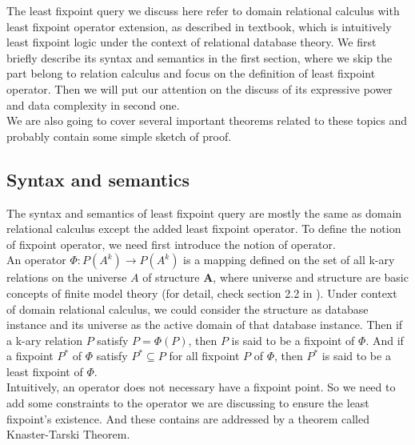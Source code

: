 The least fixpoint query we discuss here refer to domain relational calculus with least fixpoint operator extension, as described in textbook\cite{Abiteboul1}, which is intuitively least fixpoint logic under the context of relational database theory. We first briefly describe its syntax and semantics in the first section, where we skip the part belong to relation calculus and focus on the definition of least fixpoint operator. Then we will put our attention on the discuss of its expressive power and data complexity in second one. \\
We are also going to cover several important theorems related to these topics and probably contain some simple sketch of proof.

\subsection{Syntax and semantics}
The syntax and semantics of least fixpoint query are mostly the same as domain relational calculus except the added least fixpoint operator. To define the notion of fixpoint operator, we need first introduce the notion of operator. \\
An operator $\Phi: \textit{P}(A^k)\rightarrow \textit{P}(A^k)$ is a mapping defined on the set of all k-ary relations on the universe $A$ of structure $\textbf{A}$, where universe and structure are basic concepts of finite model theory (for detail, check section 2.2 in \cite{kolaitis1}). Under context of domain relational calculus, we could consider the structure as database instance and its universe as the active domain of that database instance. Then if a k-ary relation $P$ satisfy $P=\Phi(P)$, then $P$ is said to be a fixpoint of $\Phi$. And if a fixpoint $P^*$ of $\Phi$ satisfy $P^*\subseteq P$ for all fixpoint $P$ of $\Phi$, then $P^*$ is said to be a least fixpoint of $\Phi$.\\
Intuitively, an operator does not necessary have a fixpoint point. So we need to add some constraints to the operator we are discussing to ensure the least fixpoint's existence. And these contains are addressed by a theorem called Knaster-Tarski Theorem\cite{Tarski}. \\

